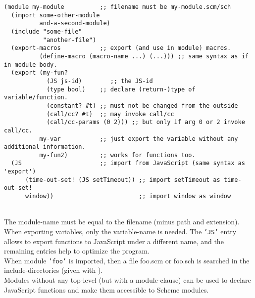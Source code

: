 \begin{verbatim}
(module my-module          ;; filename must be my-module.scm/sch
  (import some-other-module
          and-a-second-module)
  (include "some-file"
           "another-file")
  (export-macros           ;; export (and use in module) macros.
          (define-macro (macro-name ...) (...))) ;; same syntax as if in module-body.
  (export (my-fun?
            (JS js-id)        ;; the JS-id
            (type bool)    ;; declare (return-)type of variable/function.
            (constant? #t) ;; must not be changed from the outside
            (call/cc? #t)  ;; may invoke call/cc
            (call/cc-params (0 2))) ;; but only if arg 0 or 2 invoke call/cc.
          my-var           ;; just export the variable without any additional information.
          my-fun2)         ;; works for functions too.
  (JS                      ;; import from JavaScript (same syntax as 'export')
      (time-out-set! (JS setTimeout)) ;; import setTimeout as time-out-set!
      window))                        ;; import window as window
\end{verbatim}\\
The module-name must be equal to the filename (minus path and extension).\\
When exporting variables, only the variable-name is needed. The
\texttt{'JS'} entry allows to export functions to JavaScript
under a different name, and the remaining entries help  to optimize the
program.\\
When module \texttt{'foo'} is imported, then a file foo.scm or
foo.sch is searched in the include-directories (given with
 ).\\
Modules without any top-level (but with a module-clause) can be used to
declare JavaScript functions and make them accessible to Scheme modules.
